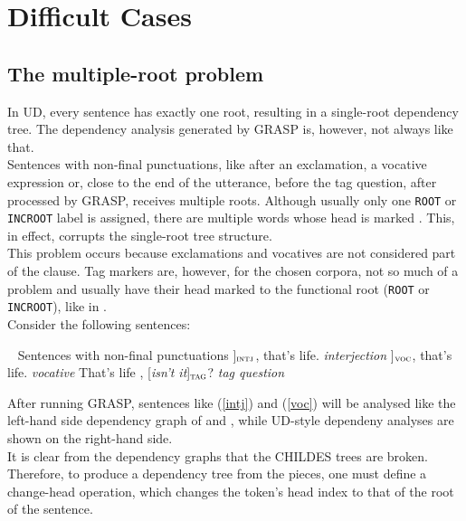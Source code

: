 \section{Difficult Cases}\label{sec:grdifficult}
\subsection{The multiple-root problem}
In UD, every sentence has exactly one root, resulting in a single-root dependency tree. The dependency analysis generated by GRASP is, however, not always like that.\\

Sentences with non-final punctuations, like after an exclamation, a vocative expression or, close to the end of the utterance, before the tag question, after processed by GRASP, receives multiple roots. Although usually only one \texttt{ROOT} or \texttt{INCROOT} label is assigned, there are multiple words whose head is marked . This, in effect, corrupts the single-root tree structure.\\

This problem occurs because exclamations and vocatives are not considered part of the clause. Tag markers are, however, for the chosen corpora, not so much of a problem and usually have their head marked to the functional root (\texttt{ROOT} or \texttt{INCROOT}), like in .\\

Consider the following sentences:

\pex~ Sentences with non-final punctuations\label{roots}
\a {[\sl Well\/}]$_{\text{\sc intj}}$, that's life.        \hfill {\sl interjection}\label{intj}
\a {[\sl  Son\/}]$_{\text{\sc voc}}$, that's life.         \hfill {\sl vocative}\label{voc}
\a That's life , {[\sl isn't it}]$_{\text{\sc tag}}$?    \hfill {\sl tag question}\label{tagq}
\xe


After running GRASP, sentences like (\ref{intj}) and (\ref{voc}) will be analysed like the left-hand side dependency graph of  and , while UD-style dependeny analyses are shown on the right-hand side.\\


It is clear from the dependency graphs that the CHILDES trees are broken. Therefore, to produce a dependency tree from the pieces, one must define a change-head operation, which changes the token's head index to that of the root of the sentence.\\


